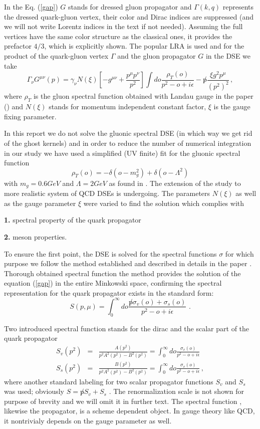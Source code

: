 \documentclass[aps,prd,superscriptaddress,eqsecnum,amsfonts,showpacs,epsfig]{revtex4}
\newcommand{\be}{\begin{equation}}
\newcommand{\ee}{\end{equation}}
\newcommand{\bea}{\begin{eqnarray}}
\newcommand{\eea}{\end{eqnarray}}
\newcommand{\ep}{i\epsilon}
\begin{document}
In the Eq. (\ref{gap}) $G $ stands for dressed gluon propagator and   $\Gamma(k,q)$ represents  the dressed quark-gluon vertex, their color and Dirac indices are suppressed (and we will not write Lorentz indices in the text if not needed).  Assuming the full vertices have the same color structure as  the classical ones, it provides the prefactor $4/3$, which is explicitly shown.
The popular LRA is used and for the product of the quark-gluon vertex $\Gamma$ and the  gluon propagator $G$ in the DSE we take
%
\be \label{kernel}
\Gamma_{\nu} G^{\mu\nu}(p)=\gamma_{\nu}N(\xi)\left[-g^{\mu\nu}+\frac{p^{\mu}p^{\nu}}{p^2}\right]\int do \frac{\rho_T(o)}{p^2-o+\ep}
 -\not p \frac{\xi g^2 p^{\mu} }{(p^2)^2} \, ,
\ee
where $\rho_T$ is the gluon spectral function obtained with Landau gauge in the paper (\cite{s2}) and  $N(\xi)$ stands for  momentum 
independent constant factor, $\xi$ is the  gauge fixing parameter.

In this report we do not solve the gluonic spectral  DSE (in which  way we  get  rid  of the ghost kernels) and
in  order to reduce the number of numerical integration in our  study we have used a simplified (UV finite) fit for the gluonic spectral function 
\be \label{prase}
\rho_T(o)=-\delta(o-m_g^2)+\delta(o-\Lambda^2)
\ee
with $m_g=0.6 GeV$ and $\Lambda=2 GeV$ as found in \cite{s2}.
  The extension of the study  \cite{s2}  to more realistic system of  QCD DSEs  is undergoing.
The parameters $N(\xi)$ as well as the gauge parameter $\xi$ were varied to find the solution which complies with
\

{\bf 1.} spectral property of the quark propagator
\

{\bf 2.}  meson properties.  
 \  

To ensure the first point, the   DSE is solved  for the  spectral functions $\sigma$ for which purpose 
we  follow  the method  established and  described in details in the paper \cite{s1}. Thorough obtained spectral function the method provides the solution of the equation (\ref{gap}) in the entire Minkowski space, confirming
the spectral representation for the quark propagator exists in the standard form:
%
\be  \label{spec1}
S(p,\mu)=\int_0^{\infty} d o \frac{\not p \sigma_v(o)+\sigma_s(o)}{p^2-o+\ep}\, \, .
\ee

Two introduced spectral function stands for the dirac and the scalar part of the quark propagator
\bea
S_v(p^2)&=&\frac{A(p^2)}{p^2 A^2(p^2)-B^2(p^2)}=\int_0^{\infty} d o \frac{ \sigma_v(o)}{p^2-o+\ep}
\\
 S_s(p^2)&=&\frac{B(p^2)}{p^2 A^2(p^2)-B^2(p^2)}=\int_0^{\infty} d o \frac{ \sigma_v(o)}{p^2-o+\ep} \, ,
\label{spec2}
\eea
 where  another standard labeling  for two scalar propagator functions $S_v$ and $S_s$ was used; obviously $S=\not p S_v+S_s$  . 
 The renormalization scale is not shown for purpose of brevity and we will omit it in further text. The spectral function , likewise the propagator, is a scheme dependent object. In gauge theory like QCD, it nontrivialy 
 depends on the gauge parameter as well. 
 
\end{document}
